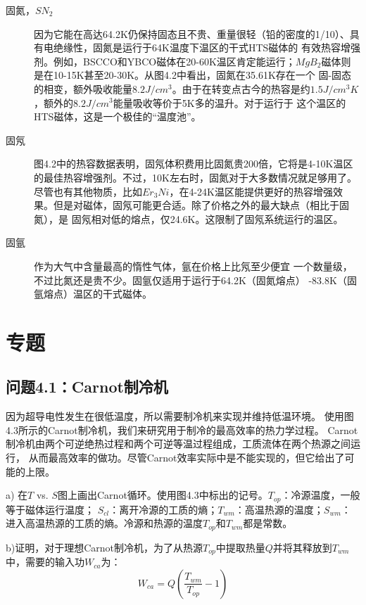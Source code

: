 \begin{description}
  \item[固氮，$SN_2$] 因为它能在高达64.2K仍保持固态且不贵、重量很轻（铅的密度的1/10）、具有电绝缘性，固氮是运行于64K温度下温区的干式HTS磁体的
  有效热容增强剂。例如，BSCCO和YBCO磁体在20-60K温区肯定能运行；$MgB_2$磁体则是在10-15K甚至20-30K。从图4.2中看出，固氮在35.61K存在一个
  固-固态的相变，额外吸收能量$8.2J/cm^3$。由于在转变点古今的热容是约$1.5J/cm^3 K$，额外的$8.2J/cm^3$能量吸收等价于5K多的温升。对于运行于
  这个温区的HTS磁体，这是一个极佳的“温度池”。
  \item[固氖] 图4.2中的热容数据表明，固氖体积费用比固氮贵200倍，它将是4-10K温区的最佳热容增强剂。不过，10K左右时，固氮对于大多数情况就足够用了。
  尽管也有其他物质，比如$Er_3 Ni$，在4-24K温区能提供更好的热容增强效果。但是对磁体，固氖可能更合适。除了价格之外的最大缺点（相比于固氮），是
  固氖相对低的熔点，仅24.6K。这限制了固氖系统运行的温区。
  \item[固氩] 作为大气中含量最高的惰性气体，氩在价格上比氖至少便宜 一个数量级，不过比氮还是贵不少。固氩仅适用于运行于64.2K（固氮熔点）
  -83.8K（固氩熔点）温区的干式磁体。
\end{description}

\section{专题}
\subsection{问题4.1：Carnot制冷机}
因为超导电性发生在很低温度，所以需要制冷机来实现并维持低温环境。
使用图4.3所示的Carnot制冷机，我们来研究用于制冷的最高效率的热力学过程。
Carnot制冷机由两个可逆绝热过程和两个可逆等温过程组成，工质流体在两个热源之间运行，
从而最高效率的做功。尽管Carnot效率实际中是不能实现的，但它给出了可能的上限。

a) 在$T$ vs. $S$图上画出Carnot循环。使用图4.3中标出的记号。$T_{op}$：冷源温度，一般等于磁体运行温度；
$S_{cl}$：离开冷源的工质的熵；$T_{wm}$：高温热源的温度；$S_{wm}$：进入高温热源的工质的熵。冷源和热源的温度$T_{op}$和$T_{wm}$都是常数。

b)证明，对于理想Carnot制冷机，为了从热源$T_{op}$中提取热量$Q$并将其释放到$T_{wm}$中，需要的输入功$W_{ca}$为：
\begin{equation}%
W_{ca}=Q(\frac{T_{wm}}{T_{op}}-1)
\end{equation}

